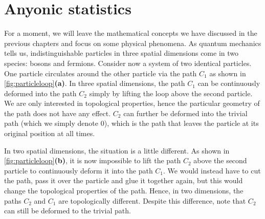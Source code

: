 \section{Anyonic statistics}

For a moment, we will leave the mathematical concepts we have discussed in the previous chapters and focus on some physical phenomena. As quantum mechanics tells us, indistinguishable particles in three spatial dimensions come in two species: bosons and fermions. Consider now a system of two identical particles. One particle circulates around the other particle via the path $C_1$ as shown in \cref{fig:particleloop}\textbf{(a)}. In three spatial dimensions, the path $C_1$ can be continuously deformed into the path $C_2$ simply by lifting the loop above the second particle. We are only interested in topological properties, hence the particular geometry of the path does not have any effect. $C_2$ can further be deformed into the trivial path (which we simply denote $0$), which is the path that leaves the particle at its original position at all times. 

In two spatial dimensions, the situation is a little different. As shown in \cref{fig:particleloop}\textbf{(b)}, it is now impossible to lift the path $C_2$ above the second particle to continuously deform it into the path $C_1$. We would instead have to cut the path, pass it over the particle and glue it together again, but this would change the topological properties of the path. Hence, in two dimensions, the paths $C_2$ and $C_1$ are topologically different. Despite this difference, note that $C_2$ can still be deformed to the trivial path. 

